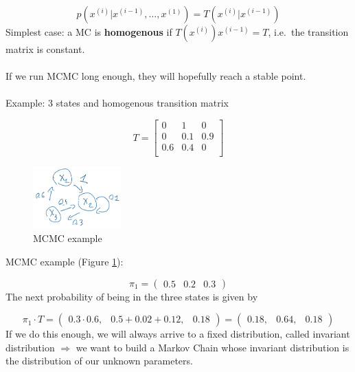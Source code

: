 $$
p(x^{(i)}|x^{(i-1)},\dots,x^{(1)})=T(x^{(i)}|x^{(i-1)})
$$
\noindent
Simplest case: a MC is \textbf{homogenous} if $T(x^{(i)})x^{(i-1)}=T$,
i.e.~the transition matrix is constant.
\\
\\
\noindent
If we run MCMC long enough, they will hopefully reach a stable point.
\\
\\
\noindent
Example: 3 states and homogenous transition matrix

$$
T = \begin{bmatrix}
0 & 1 & 0\\
0 & 0.1 & 0.9\\ 0.6 & 0.4 & 0\\
\end{bmatrix}
$$

\begin{figure}
\centering
\includegraphics[width=0.3\textwidth]{mcmc.png}
\caption{MCMC example}
\label{fig:MCMCexample}
\end{figure}

MCMC example (Figure \ref{fig:MCMCexample}):

$$
\pi_1=\begin{pmatrix}0.5 & 0.2& 0.3 \end{pmatrix}
$$
\noindent
The next probability of being in the three states is given by

$$
\pi_1 \cdot T=\begin{pmatrix}0.3\cdot0.6, & 0.5+0.02+0.12,& 0.18 \end{pmatrix} = \begin{pmatrix}0.18, & 0.64,& 0.18 \end{pmatrix}
$$
\noindent
If we do this enough, we will always arrive to a fixed distribution,
called invariant distribution $\Rightarrow$ we want to build a Markov
Chain whose invariant distribution is the distribution of our unknown
parameters.

